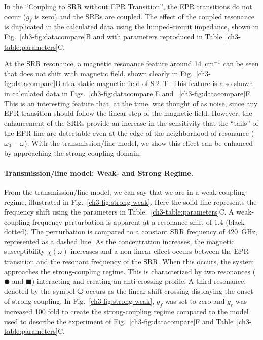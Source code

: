 In the ``Coupling to SRR without EPR Transition'', the EPR transitions do not occur ($g_f$ is zero) and the SRRs are coupled. The effect of the coupled resonance is duplicated in the calculated data using the lumped-circuit impedance, shown in Fig.~\ref{ch3-fig:datacompare}B and with parameters reproduced in Table~\ref{ch3-table:parameters}C. 

At the SRR resonance, a magnetic resonance feature around 14~cm$^{-1}$ can be seen that does not shift with magnetic field, shown clearly in Fig.~\ref{ch3-fig:datacompare}B at a static magnetic field of 8.2~T. This feature is also shown in calculated data in Figs.~\ref{ch3-fig:datacompare}E and ~\ref{ch3-fig:datacompare}F. This is an interesting feature that, at the time, was thought of as noise, since any EPR transition should follow the linear step of the magnetic field. However, the enhancement of the SRRs provide an increase in the sensitivity that the ``tails'' of the EPR line are detectable even at the edge of the neighborhood of resonance ($\omega_0-\omega$). With the transmission\-/line model, we show this effect can be enhanced by approaching the strong-coupling domain.

\noindent \paragraph*{Transmission\-/line model: Weak- and Strong Regime.} From the transmission\-/line model, we can say that we are in a weak-coupling regime, illustrated in Fig.~\ref{ch3-fig:strong-weak}. Here the solid line represents the frequency shift using the parameters in Table.~\ref{ch3-table:parameters}C. A weak-coupling frequency perturbation is apparent at a resonance shift of 1.4 (black dotted). The perturbation is compared to a constant SRR frequency of 420~GHz, represented as a dashed line. As the concentration increases, the magnetic susceptibility $\chi(\omega)$ increases and a non-linear effect occurs between the EPR transition and the resonant frequency of the SRR. When this occurs, the system approaches the strong-coupling regime. This is characterized by two resonances ($\CIRCLE$ and $\blacksquare$) interacting and creating an anti-crossing profile. A third resonance, denoted by the symbol $\hexagon$ occurs as the linear shift crossing displaying the onset of strong-coupling. In Fig.~\ref{ch3-fig:strong-weak}, $g_f$ was set to zero and $g_r$ was increased 100 fold to create the strong-coupling regime compared to the model used to describe the experiment of Fig.~\ref{ch3-fig:datacompare}F and Table~\ref{ch3-table:parameters}C.

